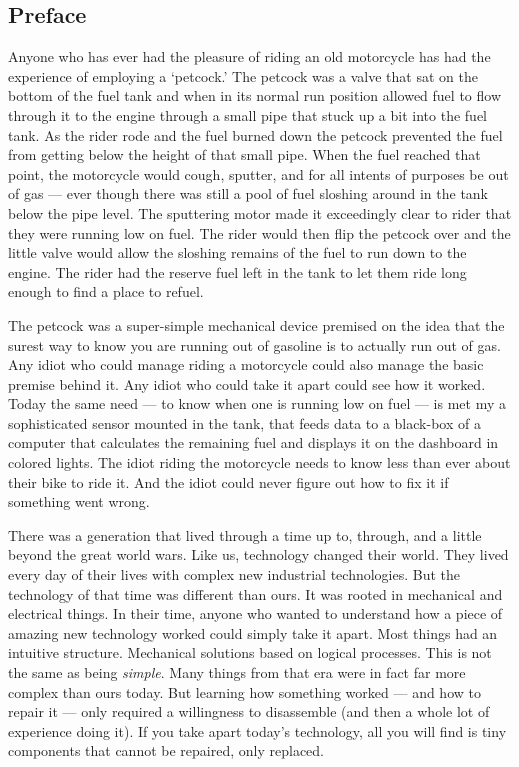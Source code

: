 \documentclass[]{article}
\date{}
\begin{document}
\hypertarget{preface}{%
\subsection{Preface}\label{preface}}

Anyone who has ever had the pleasure of riding an old motorcycle has had
the experience of employing a `petcock.' The petcock was a valve that
sat on the bottom of the fuel tank and when in its normal run position
allowed fuel to flow through it to the engine through a small pipe that
stuck up a bit into the fuel tank. As the rider rode and the fuel burned
down the petcock prevented the fuel from getting below the height of
that small pipe. When the fuel reached that point, the motorcycle would
cough, sputter, and for all intents of purposes be out of gas --- ever
though there was still a pool of fuel sloshing around in the tank below
the pipe level. The sputtering motor made it exceedingly clear to rider
that they were running low on fuel. The rider would then flip the
petcock over and the little valve would allow the sloshing remains of
the fuel to run down to the engine. The rider had the reserve fuel left
in the tank to let them ride long enough to find a place to refuel.

The petcock was a super-simple mechanical device premised on the idea
that the surest way to know you are running out of gasoline is to
actually run out of gas. Any idiot who could manage riding a motorcycle
could also manage the basic premise behind it. Any idiot who could take
it apart could see how it worked. Today the same need --- to know when
one is running low on fuel --- is met my a sophisticated sensor mounted
in the tank, that feeds data to a black-box of a computer that
calculates the remaining fuel and displays it on the dashboard in
colored lights. The idiot riding the motorcycle needs to know less than
ever about their bike to ride it. And the idiot could never figure out
how to fix it if something went wrong.

There was a generation that lived through a time up to, through, and a
little beyond the great world wars. Like us, technology changed their
world. They lived every day of their lives with complex new industrial
technologies. But the technology of that time was different than ours.
It was rooted in mechanical and electrical things. In their time, anyone
who wanted to understand how a piece of amazing new technology worked
could simply take it apart. Most things had an intuitive structure.
Mechanical solutions based on logical processes. This is not the same as
being \emph{simple}. Many things from that era were in fact far more
complex than ours today. But learning how something worked --- and how
to repair it --- only required a willingness to disassemble (and then a
whole lot of experience doing it). If you take apart today's technology,
all you will find is tiny components that cannot be repaired, only
replaced.
\end{document}
